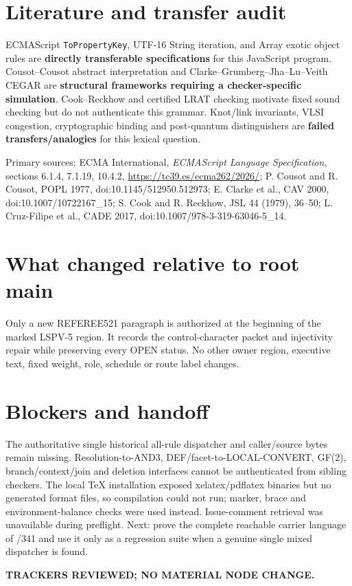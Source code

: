 \documentclass[11pt]{article}
\begin{document}
\section*{Literature and transfer audit}
ECMAScript \texttt{ToPropertyKey}, UTF-16 String iteration, and Array exotic
object rules are \textbf{directly transferable specifications} for this
JavaScript program.  Cousot--Cousot abstract interpretation and
Clarke--Grumberg--Jha--Lu--Veith CEGAR are
\textbf{structural frameworks requiring a checker-specific simulation}.
Cook--Reckhow and certified LRAT checking motivate fixed sound checking but
do not authenticate this grammar.  Knot/link invariants, VLSI congestion,
cryptographic binding and post-quantum distinguishers are
\textbf{failed transfers/analogies} for this lexical question.

Primary sources: ECMA International, \emph{ECMAScript Language
Specification}, sections 6.1.4, 7.1.19, 10.4.2,
\url{https://tc39.es/ecma262/2026/}; P. Cousot and R. Cousot, POPL 1977,
doi:10.1145/512950.512973; E. Clarke et al., CAV 2000,
doi:10.1007/10722167\_15; S. Cook and R. Reckhow, JSL 44 (1979), 36--50;
L. Cruz-Filipe et al., CADE 2017,
doi:10.1007/978-3-319-63046-5\_14.

\section*{What changed relative to root main}
Only a new REFEREE521 paragraph is authorized at the beginning of the marked
LSPV-5 region.  It records the control-character packet and injectivity
repair while preserving every OPEN status.  No other owner region,
executive text, fixed weight, role, schedule or route label changes.

\section*{Blockers and handoff}
The authoritative single historical all-rule dispatcher and caller/source
bytes remain missing.  Resolution-to-AND3, DEF/facet-to-LOCAL-CONVERT,
GF(2), branch/context/join and deletion interfaces cannot be authenticated
from sibling checkers.  The local TeX installation exposed xelatex/pdflatex
binaries but no generated format files, so compilation could not run; marker,
brace and environment-balance checks were used instead.  Issue-comment
retrieval was unavailable during preflight.  Next: prove the complete
reachable carrier language of /341 and
use it only as a regression suite when a genuine single mixed dispatcher is
found.

\textbf{TRACKERS REVIEWED; NO MATERIAL NODE CHANGE.}

\end{document}
